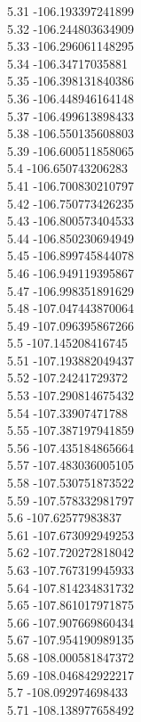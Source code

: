 {5.31	-106.193397241899\\
5.32	-106.244803634909\\
5.33	-106.296061148295\\
5.34	-106.34717035881\\
5.35	-106.398131840386\\
5.36	-106.448946164148\\
5.37	-106.499613898433\\
5.38	-106.550135608803\\
5.39	-106.600511858065\\
5.4	-106.650743206283\\
5.41	-106.700830210797\\
5.42	-106.750773426235\\
5.43	-106.800573404533\\
5.44	-106.850230694949\\
5.45	-106.899745844078\\
5.46	-106.949119395867\\
5.47	-106.998351891629\\
5.48	-107.047443870064\\
5.49	-107.096395867266\\
5.5	-107.145208416745\\
5.51	-107.193882049437\\
5.52	-107.24241729372\\
5.53	-107.290814675432\\
5.54	-107.33907471788\\
5.55	-107.387197941859\\
5.56	-107.435184865664\\
5.57	-107.483036005105\\
5.58	-107.530751873522\\
5.59	-107.578332981797\\
5.6	-107.62577983837\\
5.61	-107.673092949253\\
5.62	-107.720272818042\\
5.63	-107.767319945933\\
5.64	-107.814234831732\\
5.65	-107.861017971875\\
5.66	-107.907669860434\\
5.67	-107.954190989135\\
5.68	-108.000581847372\\
5.69	-108.046842922217\\
5.7	-108.092974698433\\
5.71	-108.138977658492\\
}
